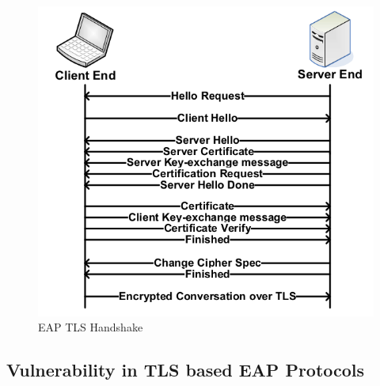 \begin{figure}[htb]
\centering	
\includegraphics[width=.9\textwidth]{images/EAP_TLS.png}
\caption{EAP TLS Handshake} 
\label{fig:EAP TLS Handshake}
\end{figure}

\subsection{Vulnerability in TLS based EAP Protocols}


